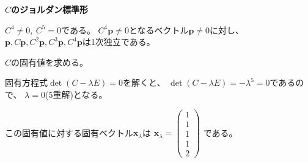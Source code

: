 \documentclass[12pt,b5paper]{ltjsarticle}
\begin{document}
\begin{enumerate}
      \textbf{$C$のジョルダン標準形}

      $C^4\ne 0,\ C^5=0$である。
      $C^4\bm{p}\ne 0$となるベクトル$\bm{p}\ne0$に対し、
      $\bm{p},C\bm{p},C^2\bm{p},C^3\bm{p},C^4\bm{p}$は1次独立である。

      $C$の固有値を求める。

      固有方程式$\det(C-\lambda E) =0$を解くと、
      $\det(C-\lambda E) = -\lambda^5=0$であるので、
      $\lambda=0$(5重解)となる。

      この固有値に対する固有ベクトル$\bm{x}_\lambda$は
      $\bm{x}_\lambda = \begin{pmatrix}1\\1\\1\\1\\2\end{pmatrix}$
      である。


\end{enumerate}
\end{document}
